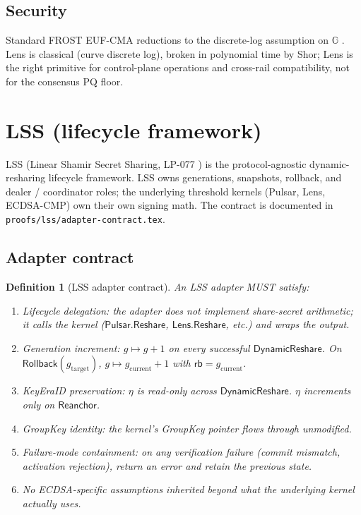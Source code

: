 \documentclass[11pt,a4paper]{article}
\newtheorem{definition}{Definition}
\begin{document}
\subsection{Security}

Standard FROST EUF-CMA reductions to the discrete-log assumption on $\mathbb{G}$ \cite{rfc9591}. Lens is classical (curve discrete log), broken in polynomial time by Shor; Lens is the right primitive for control-plane operations and cross-rail compatibility, not for the consensus PQ floor.

\section{LSS (lifecycle framework)}
\label{sec:spec-lss}

LSS (Linear Shamir Secret Sharing, LP-077 \cite{lp077}) is the protocol-agnostic dynamic-resharing lifecycle framework. LSS owns generations, snapshots, rollback, and dealer / coordinator roles; the underlying threshold kernels (Pulsar, Lens, ECDSA-CMP) own their own signing math. The contract is documented in \texttt{proofs/lss/adapter-contract.tex}.

\subsection{Adapter contract}

\begin{definition}[LSS adapter contract]
\label{def:lss-adapter-contract-spec}
An LSS adapter MUST satisfy:
\begin{enumerate}[leftmargin=2em,nosep]
  \item Lifecycle delegation: the adapter does not implement share-secret arithmetic; it calls the kernel ($\mathsf{Pulsar.Reshare}$, $\mathsf{Lens.Reshare}$, etc.) and wraps the output.
  \item Generation increment: $g \mapsto g + 1$ on every successful $\mathsf{DynamicReshare}$. On $\mathsf{Rollback}(g_{\mathrm{target}})$, $g \mapsto g_{\mathrm{current}} + 1$ with $\mathsf{rb} = g_{\mathrm{current}}$.
  \item KeyEraID preservation: $\eta$ is read-only across $\mathsf{DynamicReshare}$. $\eta$ increments only on $\mathsf{Reanchor}$.
  \item GroupKey identity: the kernel's GroupKey pointer flows through unmodified.
  \item Failure-mode containment: on any verification failure (commit mismatch, activation rejection), return an error and retain the previous state.
  \item No ECDSA-specific assumptions inherited beyond what the underlying kernel actually uses.
\end{enumerate}
\end{definition}
\end{document}
